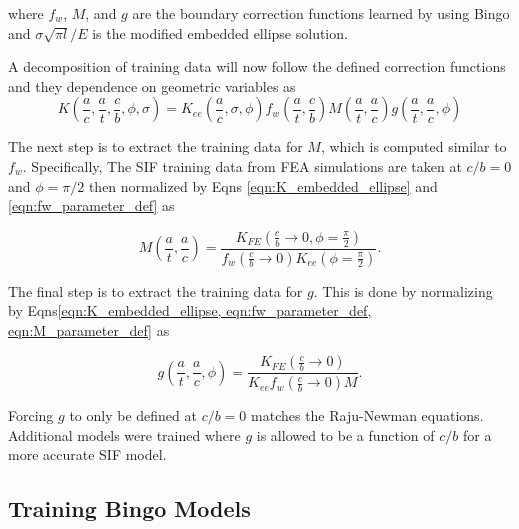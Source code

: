 where $f_w$, $M$, and $g$ are the boundary correction functions learned by using Bingo and $\sigma \sqrt{\pi l}/E$ is the modified embedded ellipse solution. 


A decomposition of training data will now follow the defined correction functions and they dependence on geometric variables as 
\begin{equation} \label{eqn:K_parameter_def}
    K\left(\frac{a}{c}, \frac{a}{t}, \frac{c}{b}, \phi, \sigma \right) = K_{ee} \left(
\frac{a}{c}, \sigma, \phi \right) f_w \left(\frac{a}{t}, \frac{c}{b} \right) M \left(\frac{a}{t}, \frac{a}{c} \right) g \left(\frac{a}{t}, \frac{a}{c}, \phi \right)
\end{equation}

 The next step is to extract the training data for $M$, which is computed similar to $f_w$. Specifically, The SIF training data from FEA simulations are taken at $c/b = 0$ and $\phi = \pi/2$ then normalized by Eqns \ref{eqn:K_embedded_ellipse} and \ref{eqn:fw_parameter_def} as

\begin{equation} \label{eqn:M_parameter_def}
    M \left(\frac{a}{t}, \frac{a}{c} \right) = \frac{K_{FE}\left(\frac{c}{b} \rightarrow 0, \phi=\frac{\pi}{2}\right)}{f_w\left(\frac{c}{b} \rightarrow 0\right) K_{ee}\left(\phi = \frac{\pi}{2} \right)}.
\end{equation}

The final step is to extract the training data for $g$. This is done by normalizing by Eqns\ref{eqn:K_embedded_ellipse, eqn:fw_parameter_def, eqn:M_parameter_def} as

\begin{equation} \label{eqn:g_parameter_def}
    g \left(\frac{a}{t}, \frac{a}{c}, \phi \right) = \frac{K_{FE}\left(\frac{c}{b} \rightarrow 0\right)}{K_{ee} f_w\left(\frac{c}{b} \rightarrow 0\right) M }.
\end{equation}

Forcing $g$ to only be defined at $c/b=0$ matches the Raju-Newman equations. Additional models were trained where $g$ is allowed to be a function of $c/b$ for a more accurate SIF model.



\subsection{Training Bingo Models}

